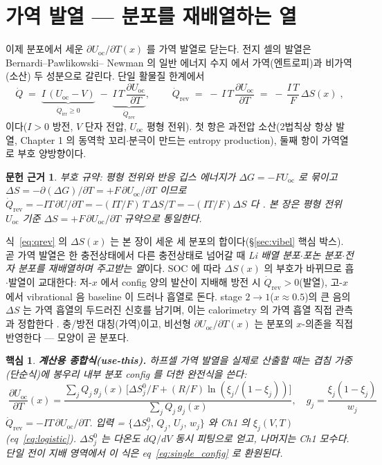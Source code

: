 \documentclass[11pt,a4paper]{article}
\newtheorem*{keybox}{핵심}
\newtheorem*{srcbox}{문헌 근거}
\newcommand{\rev}{\mathrm{rev}}
\newcommand{\irr}{\mathrm{irr}}
\newcommand{\oc}{\mathrm{oc}}
\begin{document}
\section{가역 발열 — 분포를 재배열하는 열}\label{sec:revheat}
이제 분포에서 세운 $\partial U_\oc/\partial T(x)$ 를 가역 발열로 닫는다. 전지 셀의 발열은 Bernardi--Pawlikowski--
Newman 의 일반 에너지 수지 \cite{bernardi1985} 에서 가역(엔트로피)과 비가역(소산) 두 성분으로 갈린다. 단일
활물질 한계에서
\begin{equation}
\dot Q \;=\; \underbrace{I\,(U_\oc-V)}_{\dot Q_\irr\ge0}\;-\;\underbrace{I\,T\,\frac{\partial U_\oc}{\partial T}}_{\dot Q_\rev},
\qquad
\boxed{\;\dot Q_\rev \;=\; -\,I\,T\,\frac{\partial U_\oc}{\partial T}\;=\;-\,\frac{I\,T}{F}\,\Delta S(x)\;,}
\label{eq:qrev}
\end{equation}
이다($I>0$ 방전, $V$ 단자 전압, $U_\oc$ 평형 전위). 첫 항은 과전압 소산(2법칙상 항상 발열, Chapter 1 의
동역학 꼬리$\cdot$분극이 만드는 entropy production), 둘째 항이 가역열로 부호 양방향이다.
\begin{srcbox}
부호 규약: 평형 전위와 반응 깁스 에너지가 $\Delta G=-FU_\oc$ 로 묶이고 $\Delta S=-\partial(\Delta G)/\partial T
=+F\,\partial U_\oc/\partial T$ 이므로 $\dot Q_\rev=-IT\,\partial U/\partial T=-(IT/F)\,T\,\Delta S/T=-(IT/F)\Delta S$
다 \cite{newman,msmr_partI}. 본 장은 평형 전위 $U_\oc$ 기준 $\Delta S=+F\,\partial U_\oc/\partial T$ 규약으로 통일한다.
\end{srcbox}

식~\eqref{eq:qrev} 의 $\Delta S(x)$ 는 본 장이 세운 세 분포의 합이다(\S\ref{sec:vibel} 핵심 박스). 곧 가역
발열은 한 충전상태에서 다른 충전상태로 넘어갈 때 \emph{Li 배열 분포$\cdot$포논 분포$\cdot$전자 분포를 재배열하며
주고받는 열}이다. SOC 에 따라 $\Delta S(x)$ 의 부호가 바뀌므로 흡$\cdot$발열이 교대한다: 저-$x$ 에서 config
양의 발산이 지배해 방전 시 $\dot Q_\rev>0$(발열), 고-$x$ 에서 vibrational 음 baseline 이 드러나 흡열로 돈다.
stage $2\to1$($x\approx0.5$)의 큰 음의 $\Delta S$ 는 가역 흡열의 두드러진 신호를 남기며, 이는 calorimetry 의
가역 흡열 직접 관측과 정합한다 \cite{standardised2024}. 충/방전 대칭(가역)이고, 비선형 $\partial U_\oc/\partial T(x)$
는 분포의 $x$-의존을 직접 반영한다 — 모양이 곧 분포다.

\begin{keybox}
\textbf{계산용 종합식(use-this).} 하프셀 가역 발열을 실제로 산출할 때는 겹침 가중(단순식)에 봉우리 내부 분포
config 를 더한 \emph{완전식}을 쓴다:
\[
\boxed{\;\frac{\partial U_\oc}{\partial T}(x)
=\frac{\sum_j Q_j\,g_j(x)\,\bigl[\Delta S^0_j/F+(R/F)\ln(\xi_j/(1-\xi_j))\bigr]}{\sum_j Q_j\,g_j(x)},\quad
g_j=\frac{\xi_j(1-\xi_j)}{w_j}\;}
\]
$\dot Q_\rev=-IT\,\partial U_\oc/\partial T$. \emph{입력} = $\{\Delta S^0_j,\,Q_j,\,U_j,\,w_j\}$ 와 Ch1 의
$\xi_j(V,T)$(eq~\eqref{eq:logistic}). $\Delta S^0_j$ 는 다온도 $dQ/dV$ 동시 피팅으로 얻고, 나머지는 Ch1 모수다.
단일 전이 지배 영역에서 이 식은 eq~\eqref{eq:single_config} 로 환원된다.
\end{keybox}
\end{document}
